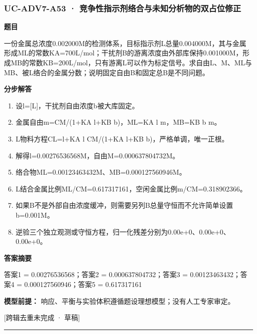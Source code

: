 \documentclass[UTF8,11pt,a4paper]{ctexart}
\begin{document}
\subsubsection*{UC-ADV7-A53 · 竞争性指示剂络合与未知分析物的双占位修正}
\noindent\textbf{题目}\par
一份金属总浓度0.002000M的检测体系，目标指示剂L总量0.004000M，其与金属形成ML的常数KA=700L/mol；干扰剂B的游离浓度由外部库保持0.001000M，形成MB的常数KB=200L/mol，只有游离L可以作为标定信号。求自由L、M、ML与MB、被L络合的金属分数；说明固定自由B和固定总B是不同问题。\par
\medskip\noindent\textbf{分步解答}
\begin{enumerate}
\item 设l=[L]，干扰剂自由浓度b被大库固定。
\item 金属自由m=CM/(1+KA l+KB b)，ML=KA l m，MB=KB b m。
\item L物料方程CL=l+KA l CM/(1+KA l+KB b)，严格单调，唯一正根。
\item 解得l=0.00276536568M，自由M=0.000637804732M。
\item 络合物ML=0.00123463432M、MB=0.000127560946M。
\item L结合金属比例ML/CM=0.617317161，空闲金属比例m/CM=0.318902366。
\item 如果B不是外部自由浓度缓冲，则需要另列B总量守恒而不允许简单设置b=0.001M。
\item 逆验三个独立观测或守恒方程，归一化残差分别为0.00e+0、0.00e+0、0.00e+0。
\end{enumerate}
\noindent\textbf{答案摘要}\par
答案1 = 0.00276536568；答案2 = 0.000637804732；答案3 = 0.00123463432；答案4 = 0.000127560946；答案5 = 0.617317161\par
\noindent\textbf{模型前提：}
响应、平衡与实验体积遵循题设理想模型；没有人工专家审定。\par
\noindent\textcolor{red!65!black}{[跨辑去重未完成 · 草稿]} \par
\medskip\hrule\medskip
{}
\end{document}
